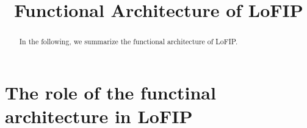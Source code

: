 \documentclass{llncs} %
\begin{document}
\title{Functional Architecture of LoFIP}
 

\maketitle

\begin{abstract}
In the following, we summarize the functional architecture of LoFIP.
\end{abstract}


\section{The role of the functinal architecture in LoFIP}
\end{document}
